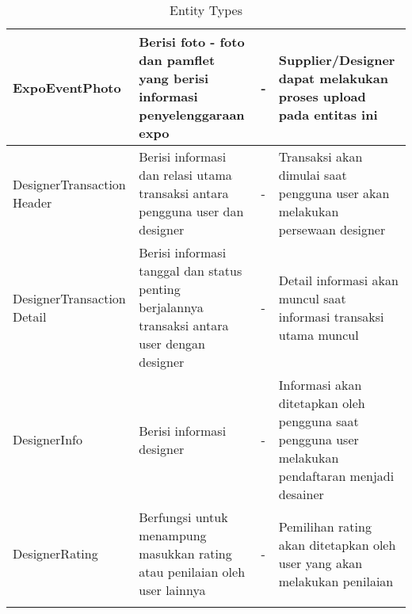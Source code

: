 \begin{longtable}{| p{3.5cm} | p{4.0cm} | l | p{4.5cm} |}
		ExpoEventPhoto & Berisi foto - foto dan pamflet yang berisi informasi penyelenggaraan expo & - & Supplier/Designer dapat melakukan proses upload pada entitas ini \\ \hline
		DesignerTransaction Header & Berisi informasi dan relasi utama transaksi antara pengguna user dan designer & - & Transaksi akan dimulai saat pengguna user akan melakukan persewaan designer \\ \hline
		DesignerTransaction Detail & Berisi informasi tanggal dan status penting berjalannya transaksi antara user dengan designer & - & Detail informasi akan muncul saat informasi transaksi utama muncul \\ \hline
		DesignerInfo & Berisi informasi  designer & - & Informasi akan ditetapkan oleh pengguna saat pengguna user melakukan pendaftaran menjadi desainer \\ \hline
		DesignerRating & Berfungsi untuk menampung masukkan rating atau penilaian oleh user lainnya & - & Pemilihan rating akan ditetapkan oleh user yang akan melakukan penilaian \\ \hline
		\caption{Entity Types}
	\end{longtable}

